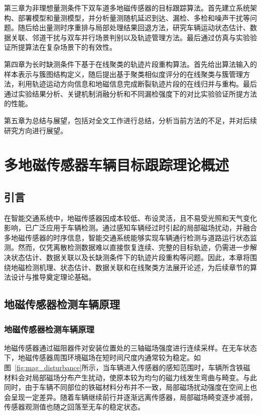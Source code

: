\documentclass{xdupgthesis}
\begin{document}
第三章为非理想量测条件下双车道多地磁传感器的目标跟踪算法。首先建立系统架构、部署模型和量测模型，并分析量测随机延迟到达、漏检、多检和噪声干扰等问题。随后给出量测时序重排与局部处理结果回退方法，研究车辆运动状态估计、数据关联、邻道干扰与双车并行场景判别以及轨迹管理方法。最后通过仿真与实验验证所提算法在复杂场景下的有效性。

第四章为长时缺测条件下基于在线聚类的轨迹片段重构算法。首先给出算法输入的样本表示与簇图结构定义，随后提出基于聚类相似度评分的在线聚类与簇管理方法，利用轨迹运动方向信息和地磁信息完成断裂轨迹片段的在线归并与重构。最后通过实验结果分析、关键机制消融分析和不同漏检强度下的对比实验验证所提方法的性能。

第五章为总结与展望，包括对全文工作进行总结，分析当前方法的不足，并对后续研究方向进行展望。




\chapter{多地磁传感器车辆目标跟踪理论概述}
\label{ch:ch2_event_detect}

\section{引言}\label{sec:ch2_intro}

在智能交通系统中，地磁传感器因成本较低、布设灵活，且不易受光照和天气变化影响，已广泛应用于车辆检测。通过感知车辆经过时引起的局部磁场扰动，并融合多地磁传感器的时序信息，智能交通系统能够实现车辆通行检测与道路运行状态监测。然而，仅凭离散检测数据难以直接恢复连续、完整的目标轨迹，仍需进一步解决状态估计、数据关联以及长缺测条件下的轨迹片段重构等问题。因此，本章将围绕地磁检测机理、状态估计、数据关联和在线聚类方法展开论述，为后续章节的算法设计与推导奠定理论基础。


\section{地磁传感器检测车辆原理}\label{sec:ch2_principle}

\subsection{地磁传感器检测车辆原理}\label{sec:ch2_basic}

地磁传感器通过磁阻器件对安装位置处的三轴磁场强度进行连续采样。在无车状态下，地磁传感器周围环境磁场在短时间尺度内通常较为稳定。如图~\ref{fig:mag_disturbance}所示，当车辆进入传感器的感知范围时，车辆所含铁磁材料会对局部磁场分布产生扰动，使原本较为均匀的磁力线发生弯曲与畸变。与此同时，由于车辆不同部位的铁磁材料分布并不一致，局部磁场扰动强度在空间上也会呈现一定差异。随着车辆继续前行并逐渐远离传感器，局部磁场畸变逐步减弱，传感器观测值也随之回落至无车的稳定状态。 
\end{document}
